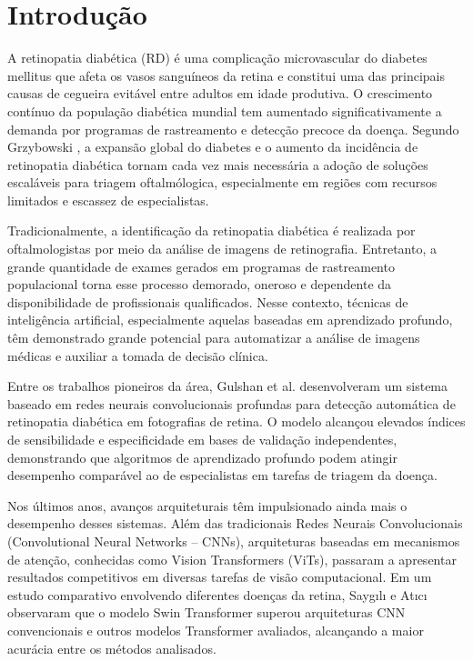 \documentclass[conference]{IEEEtran}
\begin{document}
\section{Introdu\c{c}\~ao}

A retinopatia diab\'etica (RD) \'e uma complica\c{c}\~ao microvascular
do diabetes mellitus que afeta os vasos sangu\'ineos da retina e
constitui uma das principais causas de cegueira evit\'avel entre adultos
em idade produtiva. O crescimento cont\'inuo da popula\c{c}\~ao
diab\'etica mundial tem aumentado significativamente a demanda por
programas de rastreamento e detec\c{c}\~ao precoce da doen\c{c}a.
Segundo Grzybowski \cite{grzybowski2022}, a expans\~ao global do
diabetes e o aumento da incid\^encia de retinopatia diab\'etica tornam
cada vez mais necess\'aria a ado\c{c}\~ao de solu\c{c}\~oes escal\'aveis
para triagem oftalm\'ologica, especialmente em regi\~oes com recursos
limitados e escassez de especialistas.

Tradicionalmente, a identifica\c{c}\~ao da retinopatia diab\'etica \'e
realizada por oftalmologistas por meio da an\'alise de imagens de
retinografia. Entretanto, a grande quantidade de exames gerados em
programas de rastreamento populacional torna esse processo demorado,
oneroso e dependente da disponibilidade de profissionais qualificados.
Nesse contexto, t\'ecnicas de intelig\^encia artificial, especialmente
aquelas baseadas em aprendizado profundo, t\^em demonstrado grande
potencial para automatizar a an\'alise de imagens m\'edicas e auxiliar
a tomada de decis\~ao cl\'inica.

Entre os trabalhos pioneiros da \'area, Gulshan et al. \cite{gulshan2016}
desenvolveram um sistema baseado em redes neurais convolucionais profundas
para detec\c{c}\~ao autom\'atica de retinopatia diab\'etica em fotografias
de retina. O modelo alcan\c{c}ou elevados \'indices de sensibilidade e
especificidade em bases de valida\c{c}\~ao independentes, demonstrando
que algoritmos de aprendizado profundo podem atingir desempenho
compar\'avel ao de especialistas em tarefas de triagem da doen\c{c}a.

Nos \'ultimos anos, avan\c{c}os arquiteturais t\^em impulsionado ainda
mais o desempenho desses sistemas. Al\'em das tradicionais Redes Neurais
Convolucionais (Convolutional Neural Networks -- CNNs), arquiteturas
baseadas em mecanismos de aten\c{c}\~ao, conhecidas como Vision
Transformers (ViTs), passaram a apresentar resultados competitivos em
diversas tarefas de vis\~ao computacional. Em um estudo comparativo
envolvendo diferentes doen\c{c}as da retina, Sayg{\i}l{\i} e At{\i}c{\i}
\cite{saygili2025} observaram que o modelo Swin Transformer superou
arquiteturas CNN convencionais e outros modelos Transformer avaliados,
alcan\c{c}ando a maior acur\'acia entre os m\'etodos analisados.
\end{document}
